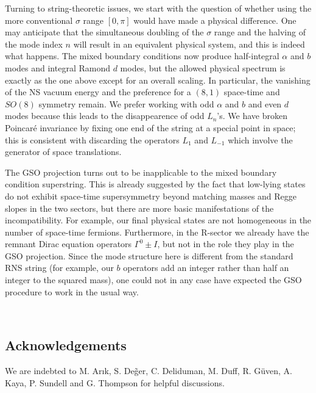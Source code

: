 \documentclass[a4paper,a4paper]{article}
\begin{document}
Turning to string-theoretic issues, we start with the question of whether
using the more conventional $\sigma$ range $[0,\pi]$ would have made a
physical difference. One may  anticipate that the simultaneous doubling of
the $\sigma$ range and the
halving of the mode index $n$ will result in an equivalent physical
system,
and this is indeed what happens.  The mixed boundary conditions now produce
half-integral $\alpha$ and $b$ modes and integral Ramond $d$ modes, but
the allowed physical spectrum is exactly as the one above except for an
overall scaling.  In particular, the vanishing of the NS vacuum energy
and the preference for a $(8,1)$ space-time and $SO(8)$ symmetry remain.
We
prefer working with odd $\alpha$ and $b$ and even $d$ modes because this
leads to the disappearence of odd $L_n$'s.  We have broken
Poincar\'{e} invariance by fixing one end of the string at a
special point in space; this is consistent with discarding the
operators  $L_1$ and $L_{-1}$ which involve the generator of space
translations.

The GSO projection turns out to be inapplicable to the mixed boundary
condition superstring.
This is already suggested by the fact that low-lying states do
not exhibit space-time supersymmetry beyond matching masses and Regge slopes
in the two sectors, but there are more basic manifestations of the
incompatibility. For example, our final physical states are not
homogeneous in the number of
space-time fermions.  Furthermore, in the R-sector we already have
the remnant Dirac equation operators $\Gamma^0 \pm I$, but not in the role
they play in the GSO projection. Since the mode structure here is
different from the standard RNS string (for example, our $b$ operators
add an integer rather than half  an integer to the squared mass), one
could not in any case have expected the GSO procedure to work in the usual
way.



\

\subsection*{Acknowledgements}

We are indebted to M. Ar\i k, S. De\~{g}er, C. Deliduman, M. Duff,
R. G\"{u}ven, A. Kaya, P. Sundell and G. Thompson for helpful
discussions. \
\end{document}
